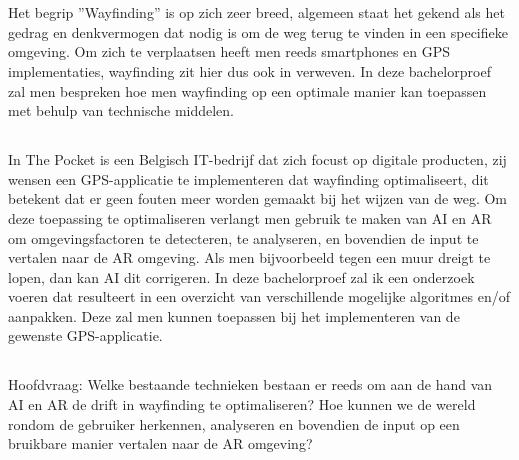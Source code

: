 \chapter{}
\label{ch:inleiding}

\section{}
\label{sec:wayfinding}
Het begrip ''Wayfinding'' is op zich zeer breed, algemeen staat het gekend als het gedrag en denkvermogen dat nodig is om de weg terug te vinden in een specifieke omgeving. Om zich te verplaatsen heeft men reeds smartphones en GPS implementaties, wayfinding zit hier dus ook in verweven. In deze bachelorproef zal men bespreken hoe men wayfinding op een optimale manier kan toepassen met behulp van technische middelen.

\section{}
\label{sec:probleemstelling}

In The Pocket is een Belgisch IT-bedrijf dat zich focust op digitale producten, zij wensen een GPS-applicatie te implementeren dat wayfinding optimaliseert, dit betekent dat er geen fouten meer worden gemaakt bij het wijzen van de weg. Om deze toepassing te optimaliseren verlangt men gebruik te maken van AI en AR om omgevingsfactoren te detecteren, te analyseren, en bovendien de input te vertalen naar de AR omgeving. Als men bijvoorbeeld tegen een muur dreigt te lopen, dan kan AI dit corrigeren. In deze bachelorproef zal ik een onderzoek voeren dat resulteert in een overzicht van verschillende mogelijke algoritmes en/of aanpakken. Deze zal men kunnen toepassen bij het implementeren van de gewenste GPS-applicatie.

\section{}
\label{sec:onderzoeksvraag}

Hoofdvraag: Welke bestaande technieken bestaan er reeds om aan de hand van AI en AR de drift in wayfinding te optimaliseren? Hoe kunnen we de wereld rondom de gebruiker herkennen, analyseren en bovendien de input op een bruikbare manier vertalen naar de AR omgeving?

